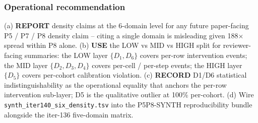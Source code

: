 \subsubsection{Operational recommendation}
(a) \textbf{REPORT} density claims at the 6-domain level for any
future paper-facing P5 / P7 / P8 density claim -- citing a single
domain is misleading given 188$\times$ spread within P8 alone.
(b) \textbf{USE} the LOW vs MID vs HIGH split for reviewer-facing
summaries: the LOW layer $\{D_1, D_6\}$ covers per-row intervention
events; the MID layer $\{D_2, D_3, D_4\}$ covers per-cell / per-step
events; the HIGH layer $\{D_5\}$ covers per-cohort calibration
violation.  (c) \textbf{RECORD} D1/D6 statistical indistinguishability
as the operational equality that anchors the per-row intervention
sub-layer; D5 is the qualitative outlier at 100\% per-cohort.
(d) Wire \texttt{synth\_iter140\_six\_density.tsv} into the
P5P8-SYNTH reproducibility bundle alongside the iter-136 five-domain
matrix.
